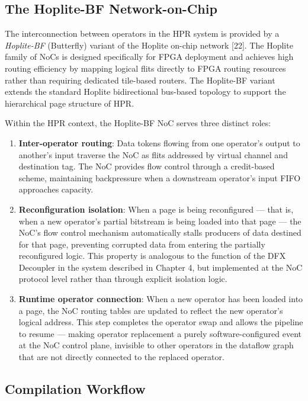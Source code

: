 \subsection{The Hoplite-BF Network-on-Chip}

The interconnection between operators in the HPR system is provided by a \textit{Hoplite-BF} (Butterfly) variant of the Hoplite on-chip network [22]. The Hoplite family of NoCs is designed specifically for FPGA deployment and achieves high routing efficiency by mapping logical flits directly to FPGA routing resources rather than requiring dedicated tile-based routers. The Hoplite-BF variant extends the standard Hoplite bidirectional bus-based topology to support the hierarchical page structure of HPR.

Within the HPR context, the Hoplite-BF NoC serves three distinct roles:

\begin{enumerate}
  \item \textbf{Inter-operator routing}: Data tokens flowing from one operator's output to another's input traverse the NoC as flits addressed by virtual channel and destination tag. The NoC provides flow control through a credit-based scheme, maintaining backpressure when a downstream operator's input FIFO approaches capacity.
  \item \textbf{Reconfiguration isolation}: When a page is being reconfigured — that is, when a new operator's partial bitstream is being loaded into that page — the NoC's flow control mechanism automatically stalls producers of data destined for that page, preventing corrupted data from entering the partially reconfigured logic. This property is analogous to the function of the DFX Decoupler in the system described in Chapter 4, but implemented at the NoC protocol level rather than through explicit isolation logic.
  \item \textbf{Runtime operator connection}: When a new operator has been loaded into a page, the NoC routing tables are updated to reflect the new operator's logical address. This step completes the operator swap and allows the pipeline to resume — making operator replacement a purely software-configured event at the NoC control plane, invisible to other operators in the dataflow graph that are not directly connected to the replaced operator.
\end{enumerate}
\subsection{Compilation Workflow}

